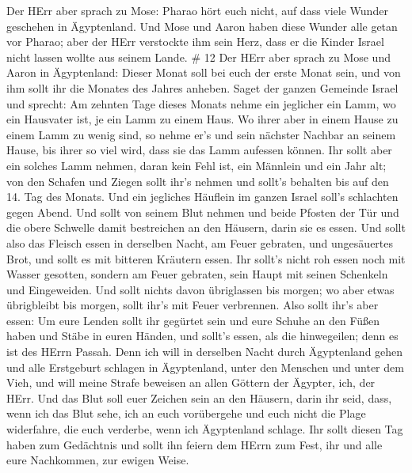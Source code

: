  Der HErr aber sprach zu Mose: Pharao hört euch nicht, auf
dass viele Wunder geschehen in Ägyptenland.  Und Mose und
Aaron haben diese Wunder alle getan vor Pharao; aber der HErr verstockte
ihm sein Herz, dass er die Kinder Israel nicht lassen wollte aus seinem
Lande. \# 12  Der HErr aber sprach zu Mose und Aaron in
Ägyptenland:  Dieser Monat soll bei euch der erste Monat
sein, und von ihm sollt ihr die Monates des Jahres anheben. 
Saget der ganzen Gemeinde Israel und sprecht: Am zehnten Tage dieses
Monats nehme ein jeglicher ein Lamm, wo ein Hausvater ist, je ein Lamm
zu einem Haus.  Wo ihrer aber in einem Hause zu einem Lamm
zu wenig sind, so nehme er's und sein nächster Nachbar an seinem Hause,
bis ihrer so viel wird, dass sie das Lamm aufessen können. 
Ihr sollt aber ein solches Lamm nehmen, daran kein Fehl ist, ein
Männlein und ein Jahr alt; von den Schafen und Ziegen sollt ihr's nehmen
 und sollt's behalten bis auf den 14. Tag des Monats. Und
ein jegliches Häuflein im ganzen Israel soll's schlachten gegen Abend.
 Und sollt von seinem Blut nehmen und beide Pfosten der Tür
und die obere Schwelle damit bestreichen an den Häusern, darin sie es
essen.  Und sollt also das Fleisch essen in derselben Nacht,
am Feuer gebraten, und ungesäuertes Brot, und sollt es mit bitteren
Kräutern essen.  Ihr sollt's nicht roh essen noch mit Wasser
gesotten, sondern am Feuer gebraten, sein Haupt mit seinen Schenkeln und
Eingeweiden.  Und sollt nichts davon übriglassen bis
morgen; wo aber etwas übrigbleibt bis morgen, sollt ihr's mit Feuer
verbrennen.  Also sollt ihr's aber essen: Um eure Lenden
sollt ihr gegürtet sein und eure Schuhe an den Füßen haben und Stäbe in
euren Händen, und sollt's essen, als die hinwegeilen; denn es ist des
HErrn Passah.  Denn ich will in derselben Nacht durch
Ägyptenland gehen und alle Erstgeburt schlagen in Ägyptenland, unter den
Menschen und unter dem Vieh, und will meine Strafe beweisen an allen
Göttern der Ägypter, ich, der HErr.  Und das Blut soll euer
Zeichen sein an den Häusern, darin ihr seid, dass, wenn ich das Blut
sehe, ich an euch vorübergehe und euch nicht die Plage widerfahre, die
euch verderbe, wenn ich Ägyptenland schlage.  Ihr sollt
diesen Tag haben zum Gedächtnis und sollt ihn feiern dem HErrn zum Fest,
ihr und alle eure Nachkommen, zur ewigen Weise.

